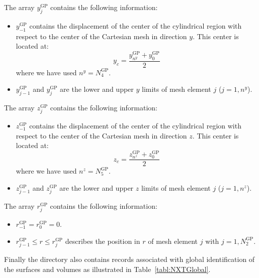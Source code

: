 The array $y^{\text{GP}}_{j}$ contains the following information:
\begin{itemize}
\item $y^{\text{GP}}_{-1}$ contains the displacement of the center of the cylindrical region with respect to the center of the Cartesian mesh in direction $y$. This
center is located at:
$$
y_{c}=\frac{y^{\text{GP}}_{n^{y}}+y^{\text{GP}}_{0}}{2}
$$
where we have used $n^{y}=N^{\text{GP}}_{4}$.
\item $y^{\text{GP}}_{j-1}$ and $y^{\text{GP}}_{j}$ are the lower and upper $y$ limits of mesh element $j$ ($j=1,n^{y}$).
\end{itemize}
The array $z^{\text{GP}}_{j}$ contains the following information:
\begin{itemize}
\item $z^{\text{GP}}_{-1}$ contains the displacement of the center of the cylindrical region with respect to the center of the Cartesian mesh in direction $z$. This
center is located at:
$$
z_{c}=\frac{z^{\text{GP}}_{n^{z}}+z^{\text{GP}}_{0}}{2}
$$
where we have used $n^{z}=N^{\text{GP}}_{5}$.
\item $z^{\text{GP}}_{j-1}$ and $z^{\text{GP}}_{j}$ are the lower and upper $z$ limits of mesh element $j$ ($j=1,n^{z}$).
\end{itemize}
  The array $r^{\text{GP}}_{j}$ contains the following information:
\begin{itemize}
\item $r^{\text{GP}}_{-1}=r^{\text{GP}}_{0}=0$. 
\item $r^{\text{GP}}_{j-1}\le r\le r^{\text{GP}}_{j}$ describes the position in $r$ of mesh element $j$ with $j=1,N^{\text{GP}}_{2}$. 
\end{itemize}

Finally the  directory also contains records associated with global identification of the surfaces and volumes as illustrated in Table~\ref{tabl:NXTGlobal}.

